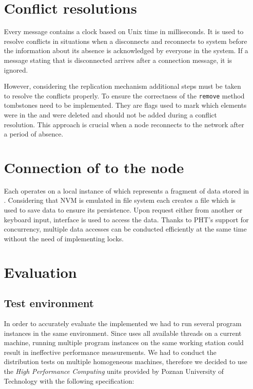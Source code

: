 \section{Conflict resolutions} \label{Conflicts}
    Every message contains a clock based on Unix time in milliseconds.
    It is used to resolve conflicts in situations when a \Node disconnects and reconnects to system before the information about its absence is acknowledged by everyone in the system.
    If a message stating that \Node is disconnected arrives after a connection message, it is ignored.
    
    However, considering the replication mechanism additional steps must be taken to resolve the conflicts properly.
    To ensure the correctness of the \texttt{remove} method tombstones need to be implemented.
    They are flags used to mark which elements were in the \PHT and were deleted and should not be added during a conflict resolution.
    This approach is crucial when a node reconnects to the network after a period of absence.

\section{Connection of \PHT to the node}
    Each \Node operates on a local instance of \PHT which represents a fragment of data stored in \DHTS.
    Considering that NVM is emulated in file system each \Node creates a file which is used to save data to ensure its persistence.
    Upon request either from another \Node or keyboard input, \PHT interface is used to access the data.
    Thanks to PHT's support for concurrency, multiple data accesses can be conducted efficiently at the same time without the need of implementing locks.

\section{Evaluation}

    \subsection{Test environment}
        In order to accurately evaluate the implemented \DHTS we had to run several program instances in the same environment.
        Since \Node uses all available threads on a current machine, running multiple program instances on the same working station could result in ineffective performance measurements.
        We had to conduct the distribution tests on multiple homogeneous machines, therefore we decided to use the \textit{High Performance Computing} units provided by Poznan University of Technology with the following specification:
        
